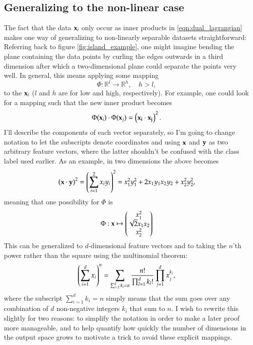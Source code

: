 \subsection{Generalizing to the non-linear case}
The fact that the data $\mathbf{x}_i$ only occur as inner products in \eqref{eqn:dual_lagrangian} makes one way of generalizing to non-linearly separable datasets straightforward: Referring back to figure \ref{fig:island_example}, one might imagine bending the plane containing the data points by curling the edges outwards in a third dimension after which a two-dimensional plane could separate the points very well. In general, this means applying some mapping
\begin{equation}
	\Phi: \mathbb{R}^l \to \mathbb{R}^h, \quad h > l,
\end{equation}
to the $\mathbf{x}_i$ ($l$ and $h$ are for low and high, respectively). For example, one could look for a mapping such that the new inner product becomes
\begin{equation}
	\Phi(\mathbf{x}_i) \cdot\Phi(\mathbf{x}_j) = \left( \mathbf{x_i}\cdot \mathbf{x_j} \right)^2. 
\end{equation}
I'll describe the components of each vector separately, so I'm going to change notation to let the subscripts denote coordinates and using $\mathbf{x}$ and $\mathbf{y}$ as two arbitrary feature vectors, where the latter shouldn't be confused with the class label used earlier. As an example, in two dimensions the above becomes
\begin{equation}
	\left( \mathbf{x} \cdot \mathbf{y} \right)^2 = \left( \sum_{i=1}^2 x_i y_i \right)^2 = x_1^2 y_1^2 + 2x_1y_1x_2y_2 + x_2^2 y_2^2,
\end{equation}
meaning that one possibility for $\Phi$ is
\begin{equation}
	\Phi: \mathbf{x} \mapsto \begin{pmatrix} x_1^2 \\ \sqrt{2}x_1x_2 \\ x_2^2 \end{pmatrix}
\end{equation}
This can be generalized to $d$-dimensional feature vectors and to taking the $n$'th power rather than the square using the multinomial theorem:
\begin{equation}
	\left( \sum_{i=1}^d x_i \right)^n = \sum_{\sum_{i=1}^d k_i = n} \frac{n!}{\prod_{l=1}^d k_l!} \prod_{j = 1}^d x_j^{k_j}, \label{eqn:multinomial_raw}
\end{equation}
where the subscript $\sum_{i=1}^d k_i = n$ simply means that the sum goes over any combination of $d$ non-negative integers $k_i$ that sum to $n$. I wish to rewrite this slightly for two reasons: to simplify the notation in order to make a later proof more manageable, and to help quantify how quickly the number of dimensions in the output space grows to motivate a trick to avoid these explicit mappings.

